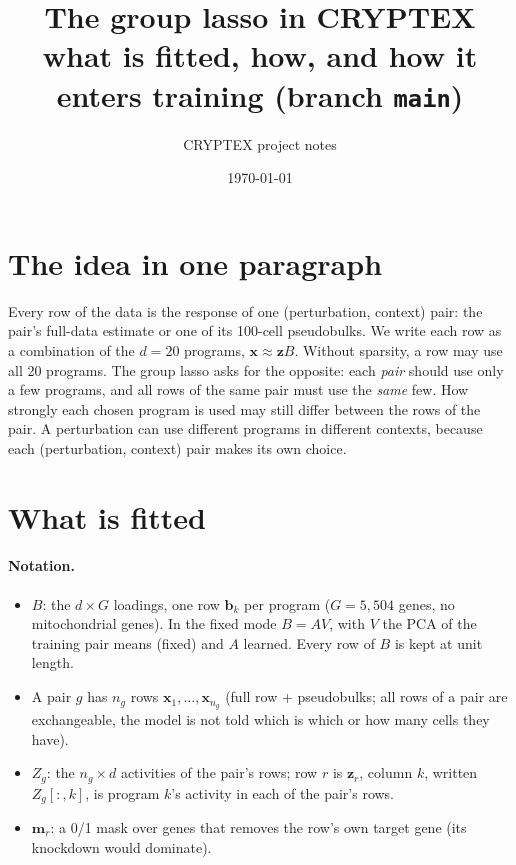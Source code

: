 \documentclass[11pt]{article}
\title{\textbf{The group lasso in CRYPTEX}\\[2pt]\large what is fitted, how, and how it enters training (branch \texttt{main})}
\author{CRYPTEX project notes}
\date{\today}
\newcommand{\x}{\mathbf{x}}
\newcommand{\z}{\mathbf{z}}
\newcommand{\m}{\mathbf{m}}
\begin{document}
\maketitle

\noindent{}
\bigskip

\section{The idea in one paragraph}

Every row of the data is the response of one (perturbation, context) pair: the
pair's full-data estimate or one of its 100-cell pseudobulks. We write each row
as a combination of the $d=20$ programs, $\x \approx \z B$. Without sparsity, a
row may use all 20 programs. The group lasso asks for the opposite: each
\emph{pair} should use only a few programs, and all rows of the same pair must
use the \emph{same} few. How strongly each chosen program is used may still
differ between the rows of the pair. A perturbation can use different programs
in different contexts, because each (perturbation, context) pair makes its own
choice.

\section{What is fitted}

\paragraph{Notation.}
\begin{itemize}
  \item $B$: the $d\times G$ loadings, one row $\mathbf b_k$ per program
  ($G=5{,}504$ genes, no mitochondrial genes). In the fixed mode $B=AV$, with
  $V$ the PCA of the training pair means (fixed) and $A$ learned. Every row of
  $B$ is kept at unit length.
  \item A pair $g$ has $n_g$ rows $\x_1,\dots,\x_{n_g}$ (full row + pseudobulks;
  all rows of a pair are exchangeable, the model is not told which is which or
  how many cells they have).
  \item $Z_g$: the $n_g\times d$ activities of the pair's rows; row $r$ is
  $\z_r$, column $k$, written $Z_g[:,k]$, is program $k$'s activity in each of
  the pair's rows.
  \item $\m_r$: a 0/1 mask over genes that removes the row's own target gene
  (its knockdown would dominate).
\end{itemize}
\end{document}
